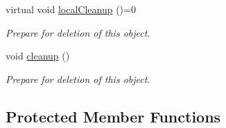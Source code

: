 \begin{DoxyCompactItemize}
virtual void \hyperlink{class_drawable_object_af2b5d9d42137f9bf15aecb5c00f79d4e}{local\-Cleanup} ()=0
\begin{DoxyCompactList}\small\item\em Prepare for deletion of this object. \end{DoxyCompactList}\item 
void \hyperlink{class_drawable_object_a179b2095fabfca278c40e4b73173066c}{cleanup} ()
\begin{DoxyCompactList}\small\item\em Prepare for deletion of this object. \end{DoxyCompactList}\end{DoxyCompactItemize}
\subsection*{Protected Member Functions}
